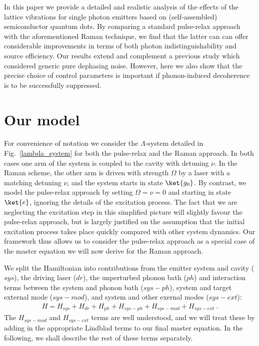 In this paper we provide a detailed and realistic analysis of the effects of the lattice vibrations for single photon emitters based on (self-assembled) semiconductor quantum dots. By comparing a standard pulse-relax approach with the aforementioned Raman technique, we find that the latter can can offer considerable improvements in terms of both photon indistinguishability and source efficiency. Our results extend and complement a previous study \cite{santori:2009} which considered generic pure dephasing noise. However, here we also show that the precise choice of control parameters is important if phonon-induced decoherence is to be successfully suppressed.

\section{Our model}


For convenience of notation we consider the $\Lambda$-system detailed in Fig.~\ref{lambda_system} for both the pulse-relax and the Raman approach. 
In both cases one arm of the system is coupled to the cavity with detuning $\nu$. %
In the Raman scheme, the other arm is driven with strength $\Omega$ by a laser with a matching detuning $\nu$, and the system starts in state $\ket{g_0}$. By contrast, we model the pulse-relax approach by setting $\Omega = \nu = 0$ and starting in state $\ket{e}$, ignoring the details of the excitation process. The fact that we are neglecting the excitation step in this simplified picture will slightly favour the pulse-relax approach, but is largely justified on the assumption that the initial excitation process takes place quickly compared with other system dynamics. Our framework thus allows us to consider the pulse-relax approach as a special case of the master equation we will now derive for the Raman approach.

We split the Hamiltonian into contributions from the emitter system and cavity ($sys$), the driving laser ($dr$), the unperturbed phonon bath ($ph$) and interaction terms between the system and phonon bath ($sys-ph$), system and target external mode ($sys-mod$), and system and other exernal modes ($sys-ext$):
\begin{eqnarray}
  H = H_{sys} + H_{dr} + H_{ph} + H_{sys-ph} + H_{sys-mod} + H_{sys-ext}~.
\end{eqnarray}
The $H_{sys-mod}$ and $H_{sys-ext}$ terms are well understood, and we will treat these by adding in the appropriate Lindblad terms to our final master equation. In the following, we shall describe the rest of these terms separately. 


